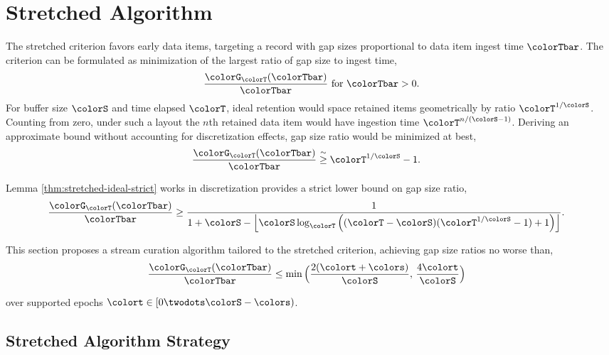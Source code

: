 \section{Stretched Algorithm} \label{sec:stretched}

The stretched criterion favors early data items, targeting a record with gap sizes proportional to data item ingest time $\colorTbar$.
The criterion can be formulated as minimization of the largest ratio of gap size to ingest time,
\begin{align*}
\frac{\colorG_{\colorT}(\colorTbar)}{\colorTbar} \text{ for } \colorTbar > 0.
\end{align*}
For buffer size $\colorS$ and time elapsed $\colorT$, ideal retention would space retained items geometrically by ratio $\colorT^{1/\colorS}$.
Counting from zero, under such a layout the $n$th retained data item would have ingestion time $\colorT^{n/(\colorS - 1)}$.
Deriving an approximate bound without accounting for discretization effects, gap size ratio would be minimized at best,
\begin{align}
\label{eqn:approx-gap-bound}
\frac{\colorG_{\colorT}(\colorTbar)}{\colorTbar}
&\stackrel{\sim}{\geq}
\colorT^{1/\colorS} - 1.
\end{align}

Lemma \ref{thm:stretched-ideal-strict} works in discretization provides a strict lower bound on gap size ratio,
\begin{align*}
\frac{\colorG_{\colorT}(\colorTbar)}{\colorTbar}
&\geq
\frac{
  1
}{
  1 + \colorS
  - \left\lfloor \colorS \log_{\colorT}\Big(
    (\colorT - \colorS)(\colorT^{1/\colorS} - 1) + 1
  \Big)\right\rfloor
}.
\end{align*}

This section proposes a stream curation algorithm tailored to the stretched criterion, achieving gap size ratios no worse than,
\begin{align*}
\frac{\colorG_{\colorT}(\colorTbar)}{\colorTbar}
&\leq
\min\Big(
  \frac{2(\colort + \colors)}{\colorS},\,
  \frac{4\colort}{\colorS}
\Big)
\end{align*}

over supported epochs $\colort \in [0\twodots\colorS - \colors)$.

\subsection{Stretched Algorithm Strategy}
\label{sec:stretched-strategy}



